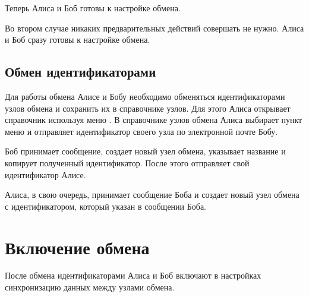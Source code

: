 \documentclass[a4paper,10pt,russian]{sphinxmanual}
\begin{document}
\sphinxAtStartPar
Теперь Алиса и Боб готовы к настройке обмена.

\sphinxAtStartPar
Во втором случае никаких предварительных действий совершать не нужно. Алиса и Боб сразу готовы к настройке обмена.


\subsection{Обмен идентификаторами}
\label{\detokenize{teamwork:id5}}
\sphinxAtStartPar
Для работы обмена Алисе и Бобу необходимо обменяться идентификаторами узлов обмена и сохранить их в справочнике узлов.
Для этого Алиса открывает справочник  используя меню . В справочнике
узлов обмена Алиса выбирает пункт меню  и отправляет идентификатор своего узла
по электронной почте Бобу.

\noindent{}
\noindent{}
\noindent{}
\noindent{}
\noindent{}
\noindent{}

\sphinxAtStartPar
Боб принимает сообщение, создает новый узел обмена, указывает название и копирует полученный идентификатор. После этого отправляет свой идентификатор Алисе.

\noindent{}
\noindent{}
\noindent{}
\noindent{}
\noindent{}

\sphinxAtStartPar
Алиса, в свою очередь, принимает сообщение Боба и создает новый узел обмена с идентификатором, который указан в сообщении Боба.


\section{Включение обмена}
\label{\detokenize{teamwork:id6}}
\sphinxAtStartPar
После обмена идентификаторами Алиса и Боб включают в настройках синхронизацию данных между узлами обмена.
\end{document}
